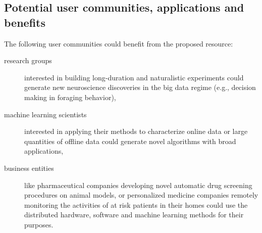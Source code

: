 \subsection{Potential user communities, applications and benefits}

%

The following user communities could benefit from the proposed resource:

\begin{description}

    \item[research groups] interested in building long-duration and
        naturalistic experiments could generate new neuroscience discoveries in
        the big data regime (e.g., decision making in foraging behavior),

    \item[machine learning scientists] interested in applying their methods to
        characterize online data or large quantities of offline data could
        generate novel algorithms with broad applications,

    \item[business entities] like pharmaceutical companies developing novel
        automatic drug screening procedures on animal models, or personalized
        medicine companies remotely monitoring the activities of at risk
        patients in their homes could use the distributed hardware, software
        and machine learning methods for their purposes.

\end{description}

